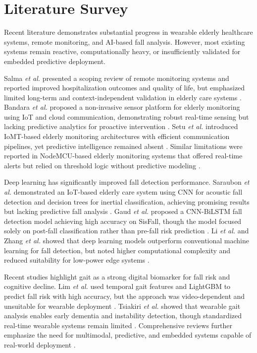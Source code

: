 \documentclass[conference]{IEEEtran}
\begin{document}
\section{Literature Survey}
Recent literature demonstrates substantial progress in wearable elderly healthcare systems, remote monitoring, and AI-based fall analysis. However, most existing systems remain reactive, computationally heavy, or insufficiently validated for embedded predictive deployment.

Salma \textit{et al.} presented a scoping review of remote monitoring systems and reported improved hospitalization outcomes and quality of life, but emphasized limited long-term and context-independent validation in elderly care systems \cite{salma2025}. Bandara \textit{et al.} proposed a non-invasive sensor platform for elderly monitoring using IoT and cloud communication, demonstrating robust real-time sensing but lacking predictive analytics for proactive intervention \cite{bandara2020}. Setu \textit{et al.} introduced IoMT-based elderly monitoring architectures with efficient communication pipelines, yet predictive intelligence remained absent \cite{setu2025,setu2024}. Similar limitations were reported in NodeMCU-based elderly monitoring systems that offered real-time alerts but relied on threshold logic without predictive modeling \cite{augastiny2023}.

Deep learning has significantly improved fall detection performance. Saraubon \textit{et al.} demonstrated an IoT-based elderly care system using CNN for acoustic fall detection and decision trees for inertial classification, achieving promising results but lacking predictive fall analysis \cite{saraubon2018}. Gaud \textit{et al.} proposed a CNN-BiLSTM fall detection model achieving high accuracy on SisFall, though the model focused solely on post-fall classification rather than pre-fall risk prediction \cite{gaud2025}. Li \textit{et al.} and Zhang \textit{et al.} showed that deep learning models outperform conventional machine learning for fall detection, but noted higher computational complexity and reduced suitability for low-power edge systems \cite{li2024,zhang2025}.

Recent studies highlight gait as a strong digital biomarker for fall risk and cognitive decline. Lim \textit{et al.} used temporal gait features and LightGBM to predict fall risk with high accuracy, but the approach was video-dependent and unsuitable for wearable deployment \cite{lim2024}. Tsiakiri \textit{et al.} showed that wearable gait analysis enables early dementia and instability detection, though standardized real-time wearable systems remain limited \cite{tsiakiri2025}. Comprehensive reviews further emphasize the need for multimodal, predictive, and embedded systems capable of real-world deployment \cite{ishaq2026,patel2023}.
\end{document}

